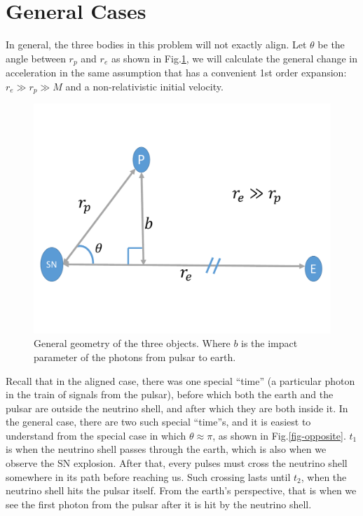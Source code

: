 \documentclass[aps,showpacs,onecolumn,floats,prd,superscriptaddress,nofootinbib]{revtex4}
\begin{document}
\section{General Cases}
\label{sec-3d}

In general, the three bodies in this problem will not exactly align. Let $\theta$ be the angle between $r_p$ and $r_e$ as shown in Fig.\ref{fig:3}, we will calculate the general change in acceleration in the same assumption that has a convenient 1st order expansion: $r_e\gg r_p\gg M$ and a non-relativistic initial velocity.

\begin{figure}[t]
\begin{center}
\includegraphics[scale = 0.3]{Image4.pdf}
\vspace{-8 mm}\caption{General geometry of the three objects. Where $b$ is the impact parameter of the photons from pulsar to earth. } 
\label{fig:3}
\end{center}
\end{figure}

Recall that in the aligned case, there was one special ``time'' (a particular photon in the train of signals from the pulsar), before which both the earth and the pulsar are outside the neutrino shell, and after which they are both inside it. In the general case, there are two such special ``time''s, and it is easiest to understand from the special case in which $\theta \approx \pi$, as shown in Fig.\ref{fig-opposite}. $t_1$ is when the neutrino shell passes through the earth, which is also when we observe the SN explosion. After that, every pulses must cross the neutrino shell somewhere in its path before reaching us. Such crossing lasts until $t_2$, when the neutrino shell hits the pulsar itself. From the earth's perspective, that is when we see the first photon from the pulsar after it is hit by the neutrino shell.
\end{document}
